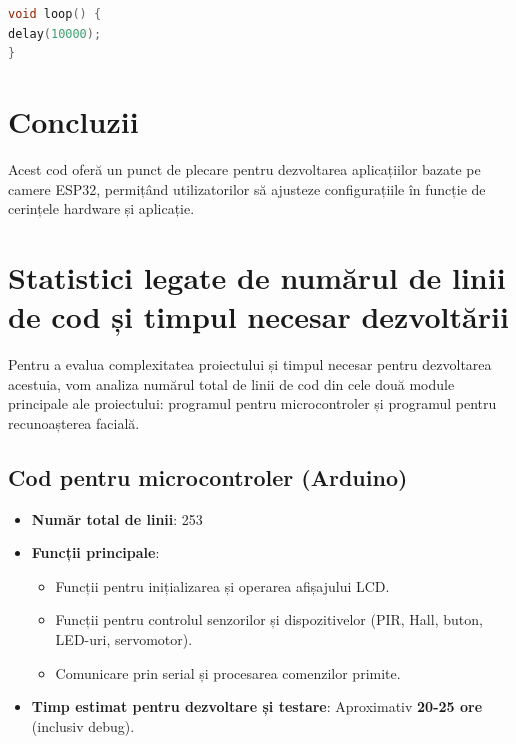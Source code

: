 \documentclass[a4paper,12pt]{report}
\begin{document}
\begin{lstlisting}[language=C, caption=Bucla principală]
void loop() {
delay(10000);
}
\end{lstlisting}

\section{Concluzii}
Acest cod oferă un punct de plecare pentru dezvoltarea aplicațiilor bazate pe camere ESP32, permițând utilizatorilor să ajusteze configurațiile în funcție de cerințele hardware și aplicație.


\section{Statistici legate de numărul de linii de cod și timpul necesar dezvoltării}

Pentru a evalua complexitatea proiectului și timpul necesar pentru dezvoltarea acestuia, vom analiza numărul total de linii de cod din cele două module principale ale proiectului: programul pentru microcontroler și programul pentru recunoașterea facială.

\subsection{Cod pentru microcontroler (Arduino)}
\begin{itemize}
    \item \textbf{Număr total de linii}: 253
    \item \textbf{Funcții principale}:
    \begin{itemize}
        \item Funcții pentru inițializarea și operarea afișajului LCD.
        \item Funcții pentru controlul senzorilor și dispozitivelor (PIR, Hall, buton, LED-uri, servomotor).
        \item Comunicare prin serial și procesarea comenzilor primite.
    \end{itemize}
    \item \textbf{Timp estimat pentru dezvoltare și testare}: Aproximativ \textbf{20-25 ore} (inclusiv debug).
\end{itemize}
\end{document}
